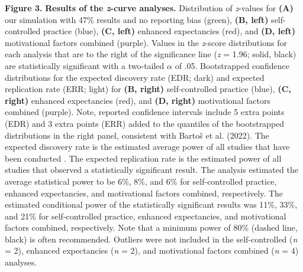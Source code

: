 \documentclass[
  man, donotrepeattitle,mask,floatsintext]{apa7}
\begin{document}
\noindent
\textbf{Figure 3.} \textbf{Results of the \emph{z}-curve analyses.} Distribution of \emph{z}-values for \textbf{(A)} our simulation with 47\% results and no reporting bias (green), \textbf{(B, left)} self-controlled practice (blue), \textbf{(C, left)} enhanced expectancies (red), and \textbf{(D, left)} motivational factors combined (purple). Values in the \emph{z}-score distributions for each analysis that are to the right of the significance line (\emph{z} = 1.96; solid, black) are statistically significant with a two-tailed \(\alpha\) of .05. Bootstrapped confidence distributions for the expected discovery rate (EDR; dark) and expected replication rate (ERR; light) for \textbf{(B, right)} self-controlled practice (blue), \textbf{(C, right)} enhanced expectancies (red), and \textbf{(D, right)} motivational factors combined (purple). Note, reported confidence intervals include 5 extra points (EDR) and 3 extra points (ERR) added to the quantiles of the bootstrapped distributions in the right panel, consistent with Bartoš et al. (2022). The expected discovery rate is the estimated average power of all studies that have been conducted . The expected replication rate is the estimated power of all studies that observed a statistically significant result. The analysis estimated the average statistical power to be 6\%, 8\%, and 6\% for self-controlled practice, enhanced expectancies, and motivational factors combined, respectively. The estimated conditional power of the statistically significant results was 11\%, 33\%, and 21\% for self-controlled practice, enhanced expectancies, and motivational factors combined, respectively. Note that a minimum power of 80\% (dashed line, black) is often recommended. Outliers were not included in the self-controlled (\emph{n} = 2), enhanced expectancies (\emph{n} = 2), and motivational factors combined (\emph{n} = 4) analyses.
\end{document}
